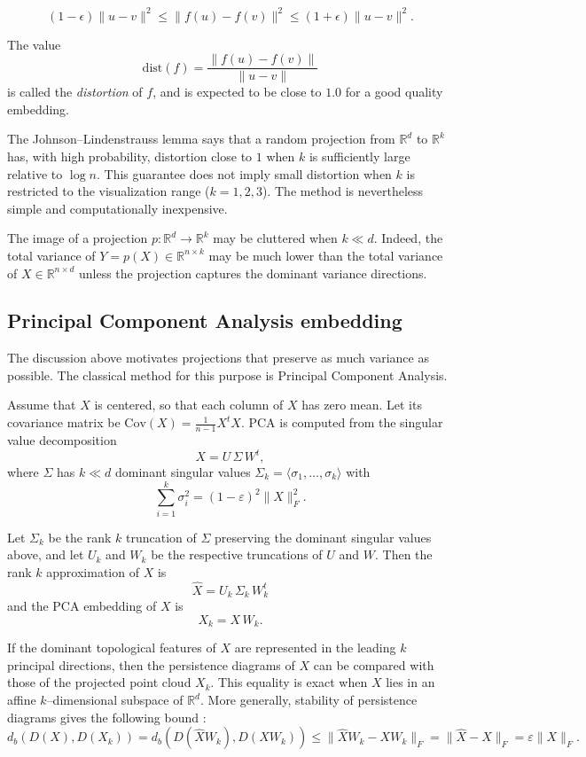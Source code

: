 \documentclass[11pt]{article}
\begin{document}
\[
(1 - \epsilon) \|u - v\|^2 \leq \|f(u) - f(v)\|^2 \leq (1 + \epsilon) \|u - v\|^2.
\]

The value \[\text{dist}(f) = \frac{\|f(u) - f(v)\|}{\|u - v\|}\] is called the \textit{distortion} of $f$, and is expected to be close to $1.0$ for a good quality embedding. 

The Johnson--Lindenstrauss lemma says that a random projection from $\mathbb{R}^d$ to $\mathbb{R}^k$ has, with high probability, distortion close to $1$ when $k$ is sufficiently large relative to $\log n$. This guarantee does not imply small distortion when $k$ is restricted to the visualization range ($k=1, 2, 3$). The method is nevertheless simple and computationally inexpensive.

The image of a projection $p: \mathbb{R}^d \rightarrow \mathbb{R}^k$ may be cluttered when $k \ll d$. Indeed, the total variance of $Y = p(X) \in \mathbb{R}^{n\times k}$ may be much lower than the total variance of $X \in \mathbb{R}^{n\times d}$ unless the projection captures the dominant variance directions.

\subsection{Principal Component Analysis embedding}

The discussion above motivates projections that preserve as much variance as possible. The classical method for this purpose is Principal Component Analysis.

Assume that $X$ is centered, so that each column of $X$ has zero mean. Let its covariance matrix be $\text{Cov}(X) = \frac{1}{n-1} X^t X$. PCA is computed from the singular value decomposition
\[ X = U \, \Sigma \, W^t, \]
where $\Sigma$ has $k \ll d$ dominant singular values $\Sigma_k = \langle \sigma_1, \ldots, \sigma_k \rangle$ with 
\[ \sum^k_{i=1} \sigma^2_i = (1 - \varepsilon)^2 \|X\|^2_F. \]

Let $\Sigma_k$ be the rank $k$ truncation of $\Sigma$ preserving the dominant singular values above, and let $U_k$ and $W_k$ be the respective truncations of $U$ and $W$. Then the rank $k$ approximation of $X$ is
\[\widehat{X} =  U_k\, \Sigma_k\, W^t_k \]
and the PCA embedding of $X$ is
\[ X_k = X\, W_k. \]

If the dominant topological features of $X$ are represented in the leading $k$ principal directions, then the persistence diagrams of $X$ can be compared with those of the projected point cloud $X_k$. This equality is exact when $X$ lies in an affine $k$--dimensional subspace of $\mathbb{R}^d$. More generally, stability of persistence diagrams gives the following bound \cite{chazal-persistence}:
\[d_b(D(X), D(X_k)) = d_b(D(\widehat{X}W_k), D(XW_k)) \leq \|\widehat{X}W_k - XW_k\|_F = \|\widehat{X} - X\|_F = \varepsilon \|X\|_F. \]
\end{document}
